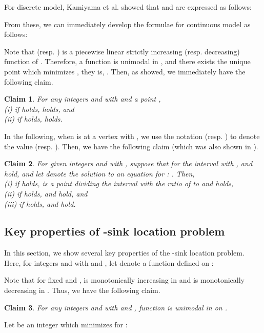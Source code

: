 \documentclass[a4paper]{llncs}
\newtheorem{clm}{Claim}
\begin{document}
For discrete model, Kamiyama et al. \cite{kkt06} showed that
 and  are expressed as follows:

From these, we can immediately develop the formulae for continuous model as follows:

Note that  (resp. ) is a piecewise linear strictly increasing (resp. decreasing) function of .
Therefore, a function  is unimodal in , and there exists the unique point which minimizes , they is, .
Then, as \cite{chknsx13,hacgknsx14,hgk14_2} showed, we immediately have the following claim.
\begin{clm}
For any integers  and  with  and a point , \\
{\rm (i)} if  holds,  holds, and \\
{\rm (ii)} if  holds,  holds.
\label{clm2}
\end{clm}
In the following, when  is at a vertex  with ,
we use the notation  (resp. ) to denote the value  (resp. ).
Then, we have the following claim (which was also shown in \cite{chknsx13,hacgknsx14,hgk14_2}).
\begin{clm}
For given integers  and  with , 
suppose that for the interval  with ,  and  hold,
and let  denote the solution to an equation for : .
Then, \\
{\rm (i)} if  holds,  is a point dividing the interval  with the ratio of  to  
and  holds, \\
{\rm (ii)} if  holds,  and  hold, and \\
{\rm (iii)} if  holds,  and  hold. \\
\label{clm2.1}
\end{clm}













\subsection{Key properties of -sink location problem}
\label{sec:mmkp}
In this section, we show several key properties of the -sink location problem.
Here, 
for integers  and  with  and , 
let  denote a function defined on :

Note that for fixed  and ,  is monotonically increasing in  and  is monotonically decreasing in .
Thus, we have the following claim.
\begin{clm}
For any integers  and  with  and ,
function  is unimodal in  on .
\label{clm1}
\end{clm}
Let  be an integer which minimizes  for :
\end{document}
